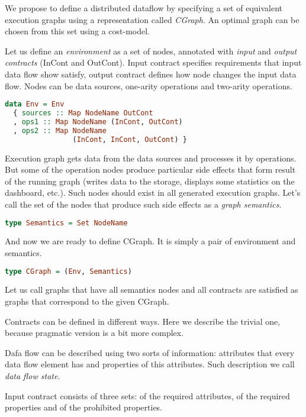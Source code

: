 We propose to define a distributed dataflow by specifying a set of equivalent execution graphs using a representation called {\em CGraph}.
An optimal graph can be chosen from this set using a cost-model.

Let us define an {\em environment} as a set of nodes, annotated with {\em input} and {\em output contracts} (InCont and OutCont).
Input contract specifies requirements that input data flow show satisfy, output contract defines how node changes the input data flow.
Nodes can be data sources, one-arity operations and two-arity operations.

\begin{lstlisting}[language=Haskell]
data Env = Env
  { sources :: Map NodeName OutCont
  , ops1 :: Map NodeName (InCont, OutCont)
  , ops2 :: Map NodeName
                (InCont, InCont, OutCont) }
\end{lstlisting}

Execution graph gets data from the data sources and processes it by operations.
But some of the operation nodes produce particular side effects that form result of the running graph (writes data to the storage, displays some statistics on the dashboard, etc.).
Such nodes should exist in all generated execution graphs.
Let's call the set of the nodes that produce such side effects as a {\em graph semantics}.

\begin{lstlisting}[language=Haskell]
type Semantics = Set NodeName
\end{lstlisting}

And now we are ready to define CGraph.
It is simply a pair of environment and semantics.

\begin{lstlisting}[language=Haskell]
type CGraph = (Env, Semantics)
\end{lstlisting}

Let us call graphs that have all semantics nodes and all contracts are satisfied as graphs that correspond to the given CGraph.

Contracts can be defined in different ways.
Here we describe the trivial one, because pragmatic version is a bit more complex.

Dafa flow can be described using two sorts of information: attributes that every data flow element has and properties of this attributes.
Such description we call {\em data flow state}.

Input contract consists of three sets: of the required attributes, of the required properties and of the prohibited properties.


